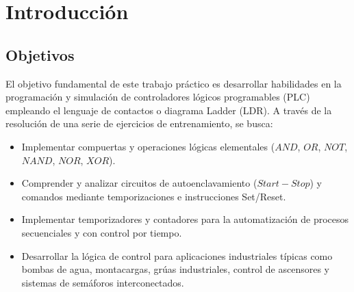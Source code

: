 \chapter{Introducción}

\section{Objetivos}
El objetivo fundamental de este trabajo práctico es desarrollar habilidades en la programación y simulación de
controladores lógicos programables (PLC) empleando el lenguaje de contactos o diagrama Ladder (LDR). A través de la
resolución de una serie de ejercicios de entrenamiento, se busca:

\begin{itemize}
    \item Implementar compuertas y operaciones lógicas elementales ($AND$, $OR$, $NOT$, $NAND$, $NOR$, $XOR$).
    \item Comprender y analizar circuitos de autoenclavamiento ($Start-Stop$) y comandos mediante temporizaciones e
    instrucciones Set/Reset.
    \item Implementar temporizadores y contadores para la automatización de procesos secuenciales y con control por tiempo.
    \item Desarrollar la lógica de control para aplicaciones industriales típicas como bombas de agua, montacargas,
    grúas industriales, control de ascensores y sistemas de semáforos interconectados.
\end{itemize}
